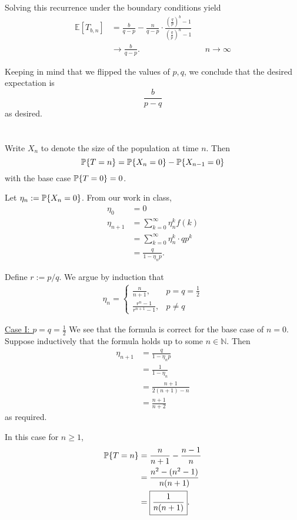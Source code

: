 \documentclass[10pt]{article}
\DeclarePairedDelimiter{\set}{\lbrace}{\rbrace}
\newcommand{\E}{\mathbb{E}}
\newcommand{\N}{\mathbb{N}}
\renewcommand{\P}{\mathbb{P}}
\begin{document}
Solving this recurrence under the boundary conditions yield
\begin{align*}
  \E[T_{b, n}]
  &= \frac{b}{q-p} - \frac{n}{q-p}\cdot \frac{\left( \frac qp \right)^b - 1}{\left( \frac qp \right)^n - 1} \\
  &\to \frac{b}{q-p}. &&n\to \infty
\end{align*}

Keeping in mind that we flipped the values of $p, q$,
we conclude that the desired expectation is
\[
  \frac{b}{p-q}
\]
as desired.

\clearpage
\section{}
Write $X_n$ to denote the size of the population at time $n$.
Then
\[
  \P\set{T=n} = \P\set{X_n=0} - \P\set{X_{n-1}=0}
\]
with the base case $\P\set{T=0} = 0$.

Let $\eta_n := \P\set{X_n=0}$.
From our work in class,
\begin{align*}
  \eta_0 &= 0 \\
  \eta_{n+1}
  &= \sum_{k=0}^\infty \eta_n^k f(k) \\
  &= \sum_{k=0}^\infty \eta_n^k\cdot qp^k \\
  &= \frac{q}{1-\eta_n p}.
\end{align*}

Define $r := p/q$.
We argue by induction that
\begin{align*}
  \eta_n =
  \begin{cases}
    \frac{n}{n+1}, &p=q=\frac12 \\
    \frac{r^n-1}{r^{n+1}-1}, &p\neq q
  \end{cases}
\end{align*}

\underline{Case I: $p=q=\frac12$}
We see that the formula is correct for the base case of $n=0$.
Suppose inductively that the formula holds up to some $n\in \N$.
Then
\begin{align*}
  \eta_{n+1}
  &= \frac{q}{1-\eta_n p} \\
  &= \frac{1}{1-\eta_n} \\
  &= \frac{n+1}{2(n+1) - n} \\
  &= \frac{n+1}{n+2}
\end{align*}
as required.

In this case for $n\geq 1$,
\begin{align*}
  \P\set{T=n}
  &= \frac{n}{n+1} - \frac{n-1}{n} \\
  &= \frac{n^2 - (n^2-1)}{n(n+1)} \\
  &= \boxed{\frac{1}{n(n+1)}}. 
\end{align*}
\end{document}
